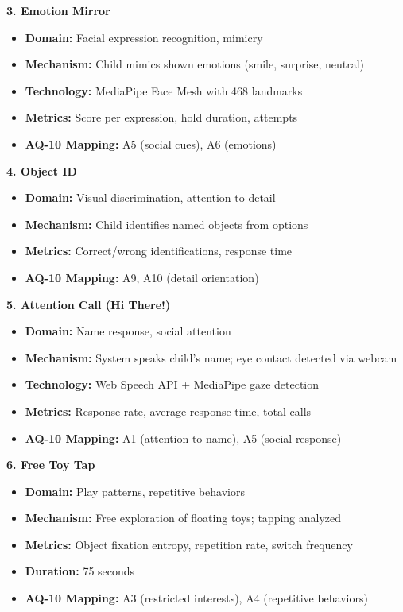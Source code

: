 \documentclass[12pt,letterpaper]{article}
\begin{document}
\textbf{3. Emotion Mirror}
\begin{itemize}
    \item \textbf{Domain:} Facial expression recognition, mimicry
    \item \textbf{Mechanism:} Child mimics shown emotions (smile, surprise, neutral)
    \item \textbf{Technology:} MediaPipe Face Mesh with 468 landmarks
    \item \textbf{Metrics:} Score per expression, hold duration, attempts
    \item \textbf{AQ-10 Mapping:} A5 (social cues), A6 (emotions)
\end{itemize}

\textbf{4. Object ID}
\begin{itemize}
    \item \textbf{Domain:} Visual discrimination, attention to detail
    \item \textbf{Mechanism:} Child identifies named objects from options
    \item \textbf{Metrics:} Correct/wrong identifications, response time
    \item \textbf{AQ-10 Mapping:} A9, A10 (detail orientation)
\end{itemize}

\textbf{5. Attention Call (Hi There!)}
\begin{itemize}
    \item \textbf{Domain:} Name response, social attention
    \item \textbf{Mechanism:} System speaks child's name; eye contact detected via webcam
    \item \textbf{Technology:} Web Speech API + MediaPipe gaze detection
    \item \textbf{Metrics:} Response rate, average response time, total calls
    \item \textbf{AQ-10 Mapping:} A1 (attention to name), A5 (social response)
\end{itemize}

\textbf{6. Free Toy Tap}
\begin{itemize}
    \item \textbf{Domain:} Play patterns, repetitive behaviors
    \item \textbf{Mechanism:} Free exploration of floating toys; tapping analyzed
    \item \textbf{Metrics:} Object fixation entropy, repetition rate, switch frequency
    \item \textbf{Duration:} 75 seconds
    \item \textbf{AQ-10 Mapping:} A3 (restricted interests), A4 (repetitive behaviors)
\end{itemize}
\end{document}
